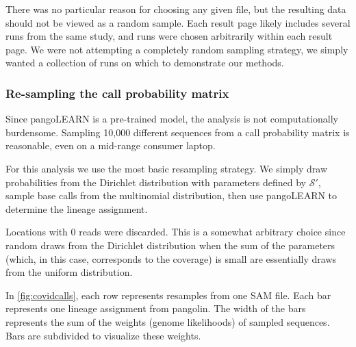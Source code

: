 \documentclass[
]{article}
\newcommand{\nps}{\mathcal{S}} %
\begin{document}
There was no particular reason for choosing any given file, but the
resulting data should not be viewed as a random sample. Each result page
likely includes several runs from the same study, and runs were chosen
arbitrarily within each result page. We were not attempting a completely
random sampling strategy, we simply wanted a collection of runs on which
to demonstrate our methods.

\hypertarget{re-sampling-the-call-probability-matrix}{%
\subsubsection{Re-sampling the call probability
matrix}\label{re-sampling-the-call-probability-matrix}}

Since pangoLEARN is a pre-trained model, the analysis is not
computationally burdensome. Sampling 10,000 different sequences from a
call probability matrix is reasonable, even on a mid-range consumer
laptop.

For this analysis we use the most basic resampling strategy. We simply
draw probabilities from the Dirichlet distribution with parameters
defined by \(\nps'\), sample base calls from the multinomial
distribution, then use pangoLEARN to determine the lineage assignment.

Locations with 0 reads were discarded. This is a somewhat arbitrary
choice since random draws from the Dirichlet distribution when the sum
of the parameters (which, in this case, corresponds to the coverage) is
small are essentially draws from the uniform distribution.

In \ref{fig:covidcalls}, each row represents resamples from one SAM
file. Each bar represents one lineage assignment from pangolin. The
width of the bars represents the sum of the weights (genome likelihoods)
of sampled sequences. Bars are subdivided to visualize these weights.
\end{document}

